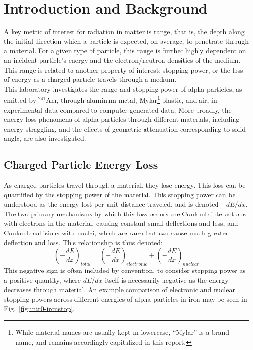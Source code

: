 \documentclass[12pt]{article}
\newcommand{\figref}[1]{Fig.~\ref{#1}}
\newcommand{\AmSrc}{\xspace$^{241}$Am\xspace}
\begin{document}
\section{Introduction and Background}
A key metric of interest for radiation in matter is range, that is, the depth along the initial direction which a particle is expected, on average, to penetrate through a material.
For a given type of particle, this range is further highly dependent on an incident particle's energy and the electron/neutron densities of the medium.\cite{npre_lab_4_manual_2025}
This range is related to another property of interest: stopping power, or the loss of energy as a charged particle travels through a medium.\\

This laboratory investigates the range and stopping power of alpha particles, as emitted by \AmSrc, through aluminum metal, Mylar\footnote{While material names are usually kept in lowercase, ``Mylar'' is a brand name, and remains accordingly capitalized in this report.} plastic, and air, in experimental data compared to computer-generated data.
More broadly, the energy loss phenomena of alpha particles through different materials, including energy straggling, and the effects of geometric attenuation corresponding to solid angle, are also investigated.
\subsection{Charged Particle Energy Loss}

As charged particles travel through a material, they lose energy.
This loss can be quantified by the stopping power of the material.
This stopping power can be understood as the energy lost per unit distance traveled, and is denoted $-dE/dx$.
The two primary mechanisms by which this loss occurs are Coulomb interactions with electrons in the material, causing constant small deflections and loss, and Coulomb collisions with nuclei, which are rarer but can cause much greater deflection and loss.
This relationship is thus denoted:
\begin{equation}\label{eq:stop-split}
    \left(-\frac{dE}{dx}\right)_{total}=\left(-\frac{dE}{dx}\right)_{electronic} + \left(-\frac{dE}{dx}\right)_{nuclear}
\end{equation}
This negative sign is often included by convention, to consider stopping power as a positive quantity, where $dE/dx$ itself is necessarily negative as the energy decreases through material.
An example comparison of electronic and nuclear stopping powers across different energies of alpha particles in iron may be seen in \figref{fig:intr0-ironstop}.\\
\end{document}
